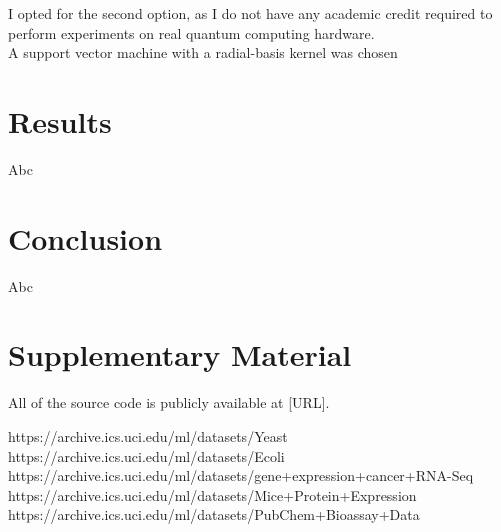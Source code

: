 \documentclass{article}
\begin{document}
  I opted for the second option, as I do not have any academic credit required to perform experiments on real quantum computing hardware. \\

  A support vector machine with a radial-basis kernel was chosen

\section{Results}
  Abc

\section{Conclusion}
  Abc

\section{Supplementary Material}
All of the source code is publicly available at [URL].

https://archive.ics.uci.edu/ml/datasets/Yeast
https://archive.ics.uci.edu/ml/datasets/Ecoli
https://archive.ics.uci.edu/ml/datasets/gene+expression+cancer+RNA-Seq
https://archive.ics.uci.edu/ml/datasets/Mice+Protein+Expression
https://archive.ics.uci.edu/ml/datasets/PubChem+Bioassay+Data
\end{document}
